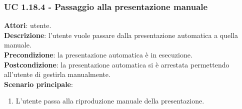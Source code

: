 	\subsubsection{UC 1.18.4 - Passaggio alla presentazione manuale}{
		\label{uc1.18.4}
		\textbf{Attori}: utente. \\
		\textbf{Descrizione}: l'utente vuole passare dalla presentazione automatica a quella manuale. \\
		\textbf{Precondizione}: la presentazione automatica è in esecuzione.	\\
		\textbf{Postcondizione}: la presentazione automatica si è arrestata permettendo all'utente di gestirla manualmente.\\
		\textbf{Scenario principale}:
		\begin{enumerate}
			\item L'utente passa alla riproduzione manuale della presentazione.
		\end{enumerate}						
	}